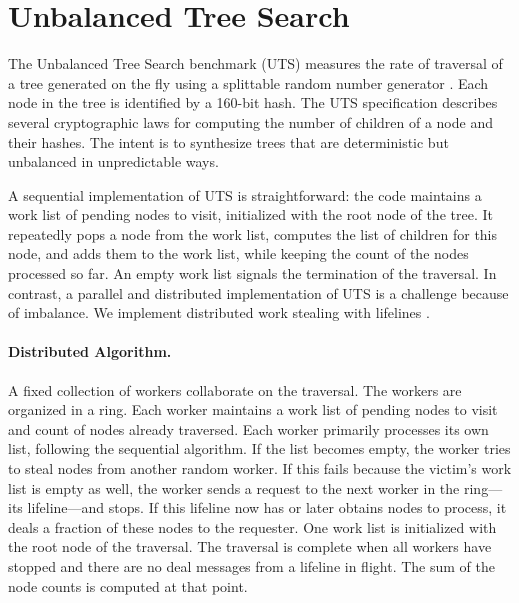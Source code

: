 \section{Unbalanced Tree Search}
\label{sec:uts}

The Unbalanced Tree Search benchmark (UTS) measures the rate of traversal of
a tree generated on the fly using a splittable random number
generator \cite{lcpc06}. Each node in the tree is identified by a 160-bit hash.
The UTS specification describes several cryptographic laws for computing the number of children of a node and their hashes.
The intent is to synthesize trees that are deterministic but unbalanced in unpredictable ways. 

A sequential implementation of UTS is straightforward: the code maintains a work list of pending nodes to visit, initialized with the root node of the tree. It repeatedly pops a node from the work list, computes the list of children for this node, and adds them to the work list, while keeping the count of the nodes processed so far. An empty work list signals the termination of the traversal.
In contrast, a parallel and distributed implementation of UTS is a challenge because of imbalance.
We implement distributed work stealing with lifelines \cite{ppopp11}.

\paragraph{Distributed Algorithm.} A fixed collection of workers collaborate on the traversal. The workers are organized in a ring.
Each worker maintains a work list of pending nodes to visit and count of nodes already traversed. Each worker primarily processes its own list, following the sequential algorithm. If the list becomes empty, the worker tries to steal nodes from another random worker. If this fails because the victim's work list is empty as well, the worker sends a request to the next worker in the ring---its lifeline---and stops. If this lifeline now has or later obtains nodes to process, it deals a fraction of these nodes to the requester. One work list is initialized with the root node of the traversal. The traversal is complete when all workers have stopped and there are no deal messages from a lifeline in flight. The sum of the node counts is computed at that point.

